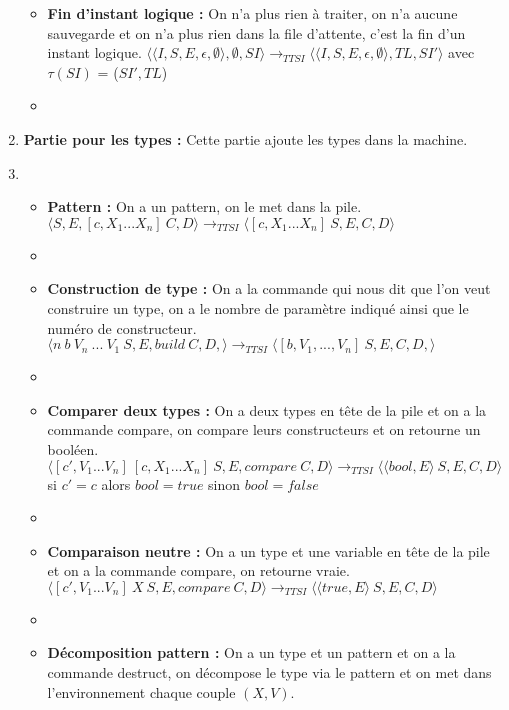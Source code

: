 \documentclass[10pt,a4paper]{report}
\begin{document}
\begin{enumerate}
\begin{itemize}
			\item[] \textbf{Fin d'instant logique :} On n'a plus rien à traiter, on n'a aucune sauvegarde et on n'a plus rien dans la file d'attente, c'est la fin d'un instant logique.
			\smallbreak
			$\langle\langle I,S,E,\epsilon,\emptyset \rangle ,\emptyset,SI\rangle 
			\longrightarrow_{TTSI} 
			\langle\langle I,S,E,\epsilon,\emptyset\rangle,TL,SI'\rangle$
			avec $\tau(SI)$ = ($SI',TL$) 
			\item[]
			
		\end{itemize}
		\item[] \textbf{Partie pour les types :} Cette partie ajoute les types dans la machine.
		\item[]
		\begin{itemize}
			\item[] \textbf{Pattern :} On a un pattern, on le met dans la pile.
			\smallbreak
			$\langle S,E,[c,X_{1}...X_{n}]~C,D\rangle
			\longrightarrow_{TTSI} \langle [c,X_{1}...X_{n}]~S,E,C,D\rangle$ 
			\item[]
			\item[] \textbf{Construction de type :} On a la commande qui nous dit que l'on veut construire un type, on a le nombre de paramètre indiqué ainsi que le numéro de constructeur.
			\smallbreak
			$\langle n~b~V_{n}~...~V_{1}~S,E,build~C,D,\rangle
			\longrightarrow_{TTSI} 
			\langle [b,V_{1},...,V_{n}]~S,E,C,D,\rangle$
			\item[]
			\item[] \textbf{Comparer deux types :} On a deux types en tête de la pile et on a la commande compare, on compare leurs constructeurs et on retourne un booléen. 
			\smallbreak
			$\langle [c',V_{1}...V_{n}]~[c,X_{1}...X_{n}]~S,E,compare~C,D\rangle
			\longrightarrow_{TTSI} 
			\langle \langle bool,E\rangle~S,E,C,D\rangle$ 
			\\ si $c'=c$ alors $bool = true$ sinon $bool = false$ 
			\item[]
			\item[] \textbf{Comparaison neutre :} On a un type et une variable en tête de la pile et on a la commande compare, on retourne vraie. 
			\smallbreak
			$\langle [c',V_{1}...V_{n}]~X~S,E,compare~C,D\rangle
			\longrightarrow_{TTSI} 
			\langle \langle true,E\rangle~S,E,C,D\rangle$ 
			\item[]
			\item[] \textbf{Décomposition pattern :} On a un type et un pattern et on a la commande destruct, on décompose le type via le pattern et on met dans l'environnement chaque couple $(X,V)$.

\end{itemize}
\end{enumerate}
\end{document}

